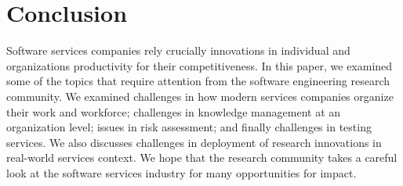 \documentclass{sig-alternate}
\begin{document}


%





\section{Conclusion}
Software services companies rely crucially innovations in individual and organizations productivity for their competitiveness. In this paper, we examined some of the topics that require attention from the software engineering research community. We examined challenges in how modern services companies organize their work and workforce; challenges in knowledge management at an organization level; issues in risk assessment; and finally challenges in testing services. We also discusses challenges in deployment of research innovations in real-world services context. We hope that the research community takes a careful look at the software services industry for many opportunities for impact.


{\small

}
\end{document}
